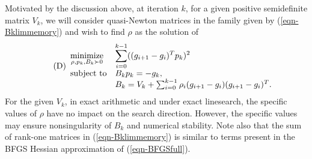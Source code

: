 \documentclass[11pt,twoside]{article}
\begin{document}
Motivated by the discussion above, at iteration $k$, for a
given positive semidefinite matrix $V_k$, %
we will consider quasi-Newton matrices in the family given by
(\ref{eqn-Bklimmemory}) and wish to find $\rho$ as the solution of
\begin{equation} \tag{D} \label{form:m1}
\begin{array}{ll}
\minimize{\rho, p_k, B_k\succ 0} & \disp{ \sum_{i=0}^{k-1}
  ((g_{i+1}- g_i)^T p_k )^2  }\\
 \subject & B_k p_k = -g_k, \\
 & B_k = V_k +  \sum_{i=0}^{k-1} \rho_{i} (g_{i+1}-g_i)(g_{i+1}-g_i)^T.
\end{array}
\end{equation}
For the given $V_k$, in exact arithmetic and under exact linesearch,
the specific values of $\rho$ have no impact on the search
direction. However, the specific values may ensure nonsingularity of
$B_k$ and numerical stability. Note also that the sum of rank-one
matrices in (\ref{eqn-Bklimmemory}) is similar to terms present in the
BFGS Hessian approximation of (\ref{eqn-BFGSfull}).
\end{document}
